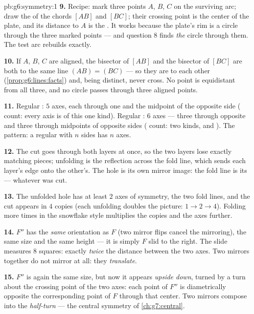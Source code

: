 \begin{solution}{pb:g6:symmetry:1}
\textbf{9.} Recipe: mark three points $A$, $B$, $C$ on the
surviving arc; draw the  of the chords
$[AB]$ and $[BC]$; their crossing point is the center of the
plate, and its distance to $A$ is the . It works because
the plate's rim is a circle through the three marked points ---
and question 8 finds \emph{the} circle through them. The test
arc rebuilds exactly.

\textbf{10.} If $A$, $B$, $C$ are aligned, the bisector of
$[AB]$ and the bisector of $[BC]$ are both  to the
same line $(AB) = (BC)$ --- so they are  to each other
(\cref{prop:g6:lines:facts}) and, being distinct, never cross.
No point is equidistant from all three, and no circle passes
through three aligned points.

\textbf{11.} Regular : $5$ axes, each through one 
and the midpoint of the opposite side ( count: every axis is
of this one kind). Regular : $6$ axes --- three through
opposite  and three through midpoints of opposite sides
( count: two kinds,  and ). The pattern: a regular
 with $n$ sides has $n$ axes.

\textbf{12.} The cut goes through both layers at once, so the
two layers lose exactly matching pieces; unfolding is the
reflection across the fold line, which sends each layer's edge
onto the other's. The hole is its own mirror image: the fold
line is its  --- whatever was cut.

\textbf{13.} The unfolded hole has at least $2$ axes of
symmetry, the two fold lines, and the cut appears in $4$ copies
(each unfolding doubles the picture: $1 \to 2 \to 4$). Folding
more times in the snowflake style multiplies the copies and the
axes further.

\textbf{14.} $F''$ has the \emph{same} orientation as $F$ (two
mirror flips cancel the mirroring), the same size and the same
height --- it is simply $F$ slid to the right. The slide
measures $8$ squares: exactly \emph{twice} the distance between
the two axes. Two  mirrors together do not mirror at
all: they \emph{translate}.

\textbf{15.} $F''$ is again the same size, but now it appears
\emph{upside down}, turned by  a turn about the crossing
point of the two axes: each point of $F''$ is diametrically
opposite the corresponding point of $F$ through that center.
Two  mirrors compose into the \emph{half-turn} ---
the central symmetry of \cref{ch:g7:central}.
\end{solution}
